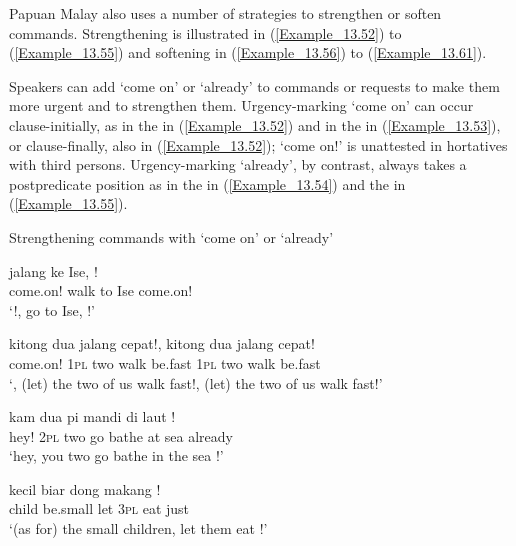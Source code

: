 Papuan Malay also uses a number of strategies to strengthen or soften commands. Strengthening is illustrated in (\ref{Example_13.52}) to (\ref{Example_13.55}) and softening in (\ref{Example_13.56}) to (\ref{Example_13.61}).



Speakers can add  ‘come on’ or  ‘already’ to commands or requests to make them more urgent and to strengthen them. Urgency-marking  ‘come on’ can occur clause-initially, as in the  in (\ref{Example_13.52}) and in the  in (\ref{Example_13.53}), or clause-finally, also in (\ref{Example_13.52});  ‘come on!’ is unattested in hortatives with third persons. Urgency-marking  ‘already’, by contrast, always takes a postpredicate position as in the  in (\ref{Example_13.54}) and the  in (\ref{Example_13.55}).


\begin{styleExampleTitle}
Strengthening commands with  ‘come on’ or  ‘already’
\end{styleExampleTitle}

\ea
\label{Example_13.52}
 {jalang} {ke} {Ise,} {!}\\ %
 come.on!  walk  to  Ise  come.on!\\
\glt 
‘!, go to Ise, !’ \textstyleExampleSource{[080917-008-NP.0065]}
\z

\ea
\label{Example_13.53}
 {kitong} {dua} {jalang} {cepat!,} {kitong} {dua} {jalang} {cepat!}\\ %
 come.on!  \textsc{1pl}  two  walk  be.fast  \textsc{1pl}  two  walk  be.fast\\
\glt 
‘, (let) the two of us walk fast!, (let) the two of us walk fast!’ \textstyleExampleSource{[081015-005-NP.0037]}
\z

\ea
\label{Example_13.54}
 {kam} {dua} {pi} {mandi} {di} {laut} {!}\\ %
 hey!  \textsc{2pl}  two  go  bathe  at  sea  already\\
\glt 
‘hey, you two go bathe in the sea !’ \textstyleExampleSource{[080917-006-CvHt.0007]}
\z

\ea
\label{Example_13.55}
 {kecil} {biar} {dong} {makang} {!}\\ %
 child  be.small  let  \textsc{3pl}  eat  just\\
\glt 
‘(as for) the small children, let them eat !’ \textstyleExampleSource{[081002-001-CvNP.0051]}
\z


